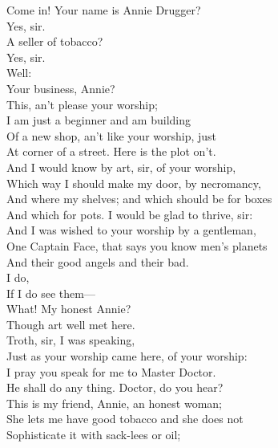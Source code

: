 \documentclass[a4paper,oneside,12pt]{memoir}
\begin{document}
\begin{drama*}
\subtlespeaks Come in! Your name is Annie Drugger?\\
\druggerspeaks {} Yes, sir.\\
\subtlespeaks A seller of tobacco?\\
\druggerspeaks {} Yes, sir.\\
\subtlespeaks {} Well:\\
Your business, Annie?\\
\druggerspeaks {} This, an't please your worship;\\
I am just a beginner and am building\\
Of a new shop, an't like your worship, just\\
At corner of a street. Here is the plot on't.\\
And I would know by art, sir, of your worship,\\
Which way I should make my door, by necromancy,\\
And where my shelves; and which should be for boxes\\
And which for pots. I would be glad to thrive, sir:\\
And I was wished to your worship by a gentleman,\\
One Captain Face, that says you know men's planets\\
And their good angels and their bad.\\
\subtlespeaks {} I do,\\
If I do see them---\\
\facespeaks {} What! My honest Annie?\\
Though art well met here.\\
\druggerspeaks {} Troth, sir, I was speaking,\\
Just as your worship came here, of your worship:\\
I pray you speak for me to Master Doctor.\\
\facespeaks He shall do any thing. Doctor, do you hear?\\
This is my friend, Annie, an honest woman;\\
She lets me have good tobacco and she does not\\
Sophisticate it with sack-lees or oil;\\

\end{drama*}
\end{document}

